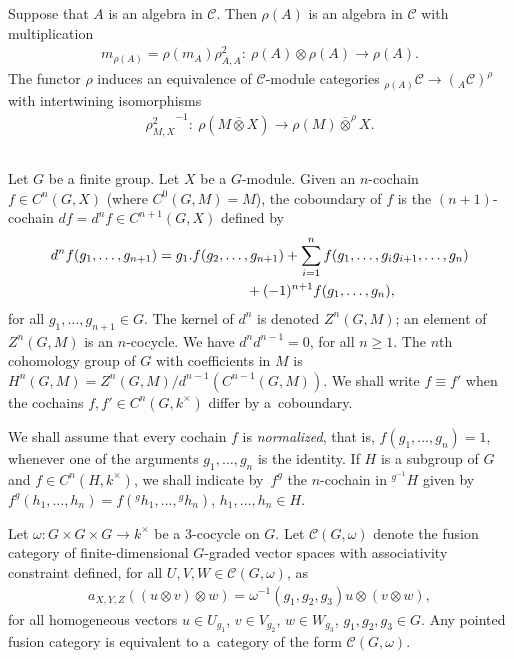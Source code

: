 \documentclass[pdftex]{sigma}
\numberwithin{equation}{section}
\newcommand{\oot}{\bar\otimes}
\newcommand{\C}{{\mathcal C}}
\newcommand{\1}{\textbf{1}}
\begin{document}
Suppose that $A$ is an algebra in $\C$. Then $\rho(A)$ is an algebra in $\C$ with multiplication
\begin{gather*}m_{\rho(A)} = \rho(m_A) \rho^2_{A, A}\colon \ \rho(A) \otimes \rho(A) \to \rho(A).\end{gather*}
The functor $\rho$ induces an equivalence of $\C$-module categories $_{\rho(A)}\C \to (_A\C)^\rho$ with intertwining isomorphisms
\begin{gather*} {\rho^2_{M, X}}^{-1}\colon \ \rho(M \oot X) \to \rho(M) \oot^\rho X.\end{gather*}

\subsection{}\label{cgomega} Let $G$ be a f\/inite group.
Let $X$ be a $G$-module. Given an $n$-cochain $f \in C^n(G, X)$ (where $C^0(G, M) = M$), the coboundary of $f$ is the $(n+1)$-cochain $df = d^nf \in C^{n+1}(G, X)$ def\/ined by
\begin{gather*}d^nf(g_1, \dots, g_{n+1}) = g_1.f(g_2, \dots, g_{n+1}) + \sum_{i = 1}^{n}f(g_1, \dots, g_ig_{i+1}, \dots, g_n)\\
 \hphantom{d^nf(g_1, \dots, g_{n+1}) =}{} + (-1)^{n+1} f(g_1, \dots, g_n),\end{gather*}
for all $g_1, \dots, g_{n+1} \in G$. The kernel of $d^n$ is denoted $Z^n(G, M)$; an element of $Z^n(G, M)$ is an $n$-cocycle. We have $d^nd^{n-1} = 0$, for all $n \geq 1$. The $n$th cohomology group of $G$ with coef\/f\/icients in $M$ is $H^n(G, M) = Z^n(G, M)/d^{n-1}(C^{n-1}(G, M))$. We shall write $f \equiv f'$ when the cochains $f, f' \in C^n(G, k^\times)$ dif\/fer by a~coboundary.

We shall assume that every cochain $f$ is \emph{normalized}, that is, $f(g_1, \dots, g_n) = 1$, whenever one of the arguments $g_1, \dots, g_n$ is the identity. If $H$ is a subgroup of $G$ and $f \in C^n(H, k^\times)$, we shall indicate by~$f^g$ the $n$-cochain in $^{g^{-1}\!}H$ given by $f^g(h_1, \dots, h_n) = f({}^g h_1, \dots, {}^g h_n)$, $h_1, \dots, h_n \in H$.

Let $\omega \colon G \times G \times G \to k^\times$ be a 3-cocycle on $G$. Let $\C(G, \omega)$ denote the fusion category of f\/inite-dimensional $G$-graded vector spaces with associativity constraint def\/ined, for all $U, V, W\in \C(G, \omega)$, as
\begin{gather*}a_{X, Y, Z} ((u \otimes v)\otimes w) = \omega^{-1}(g_1, g_2, g_3) u \otimes (v\otimes w),\end{gather*}
for all homogeneous vectors $u \in U_{g_1}$, $v \in V_{g_2}$, $w \in W_{g_3}$, $g_1, g_2, g_3 \in G$. Any pointed fusion category is equivalent to a~category of the form $\C(G, \omega)$.
\end{document}
